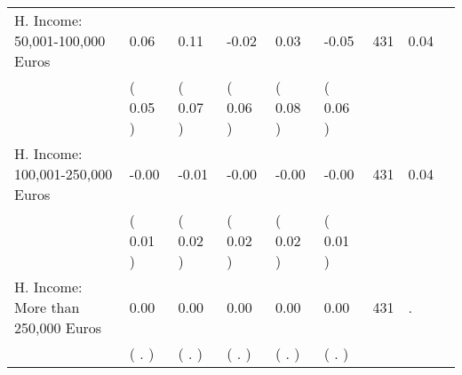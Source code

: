 \begin{tabular}{L{6.2cm} C{1.8cm} C{1.8cm} C{1.8cm} C{1.8cm} C{1.8cm} C{1.8cm} C{0.3cm} C{0.3cm}}
H. Income: 50,001-100,000 Euros &      0.06 &      0.11 &     -0.02 &      0.03 &     -0.05  & 431 &       0.04 \\ 
 & (     0.05 ) & (     0.07 ) & (     0.06 ) & (     0.08 ) & (     0.06 )  & \\
H. Income: 100,001-250,000 Euros &     -0.00 &     -0.01 &     -0.00 &     -0.00 &     -0.00  & 431 &       0.04 \\ 
 & (     0.01 ) & (     0.02 ) & (     0.02 ) & (     0.02 ) & (     0.01 )  & \\
H. Income: More than 250,000 Euros &      0.00 &      0.00 &      0.00 &      0.00 &      0.00  & 431 &          . \\ 
 & (        . ) & (        . ) & (        . ) & (        . ) & (        . )  & \\
\bottomrule
\end{tabular}
